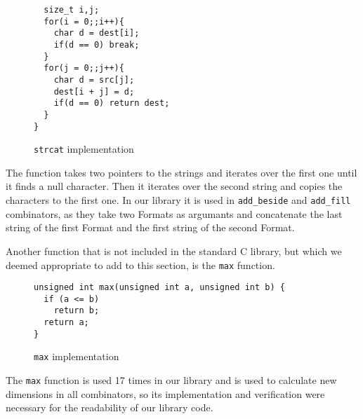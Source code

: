 \documentclass[14pt]{constructor-diploma}
\begin{document}
\begin{enumerate}
\begin{figure}[H]
\begin{mdframed}[backgroundcolor=bg]
\begin{verbatim}
  size_t i,j;
  for(i = 0;;i++){
    char d = dest[i];
    if(d == 0) break;
  }
  for(j = 0;;j++){
    char d = src[j];
    dest[i + j] = d;
    if(d == 0) return dest;
  }
}
      \end{verbatim}
      \end{mdframed}
      \caption{\texttt{strcat} implementation}
      \label{fig:strcat}
      \end{figure}
    The function takes two pointers to the strings and iterates over the first one until it finds a null character. 
    Then it iterates over the second string and copies the characters to the first one.
    In our library it is used in \texttt{add\_beside} and \texttt{add\_fill} combinators, as they take two
    Formats as argumants and concatenate the last string of the first Format and the first string of the second Format.
\end{enumerate}
Another function that is not included in the standard C library, but which we deemed appropriate to add to this section, is the \texttt{max} function.
      \begin{figure}[H]
      \begin{mdframed}[backgroundcolor=bg]
      \begin{verbatim}
unsigned int max(unsigned int a, unsigned int b) {
  if (a <= b)
    return b;
  return a;
}
      \end{verbatim}
      \end{mdframed}
      \caption{\texttt{max} implementation}
      \label{fig:max}
      \end{figure}
  The \texttt{max} function is used 17 times in our library and is used to calculate new dimensions in all combinators, 
  so its implementation and verification were necessary for the readability of our library code.

\newpage
\end{document}
